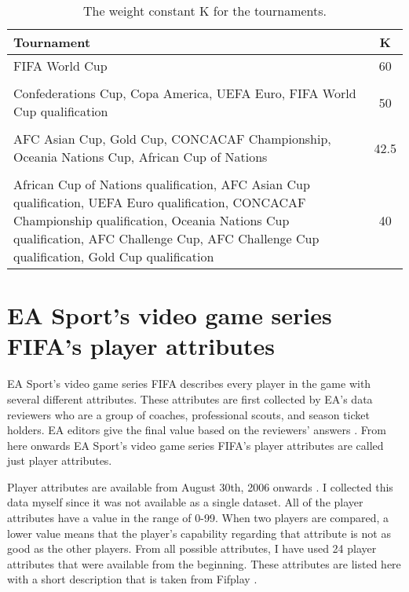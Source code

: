 \begin{table}
    \centering
    \caption{The weight constant $\mathrm { K }$ for the tournaments.}
    \label{table:weight_constant}
    \begin{tabular}{|L|c|}\hline
        \textbf{Tournament} & \textbf{K} \\\hline
        FIFA World Cup & 60 \\
        & \\
        Confederations Cup, Copa America, UEFA Euro, FIFA World Cup qualification & 50 \\
        & \\
        AFC Asian Cup, Gold Cup, CONCACAF Championship, Oceania Nations Cup, African Cup of Nations &42.5\\
        & \\
        African Cup of Nations qualification, AFC Asian Cup qualification, UEFA Euro qualification, CONCACAF Championship qualification, Oceania Nations Cup qualification, AFC Challenge Cup, AFC Challenge Cup qualification, Gold Cup qualification &  40 \\ \hline
    \end{tabular}
\end{table}

\section{EA Sport’s video game series FIFA's player attributes}
EA Sport's video game series FIFA describes every player in the game with several different attributes. These attributes are first collected by EA's data reviewers who are a group of coaches, professional scouts, and season ticket holders. EA editors give the final value based on the reviewers' answers \cite{playerattr}. From here onwards EA Sport's video game series FIFA's player attributes are called just player attributes.

Player attributes are available from August 30th, 2006 onwards \cite{sofifa}. I collected this data myself since it was not available as a single dataset.
All of the player attributes have a value in the range of 0-99. When two players are compared, a lower value means that the player's capability regarding that attribute is not as good as the other players. From all possible attributes, I have used 24 player attributes that were available from the beginning. These attributes are listed here with a short description that is taken from Fifplay \cite{playerattr}.

